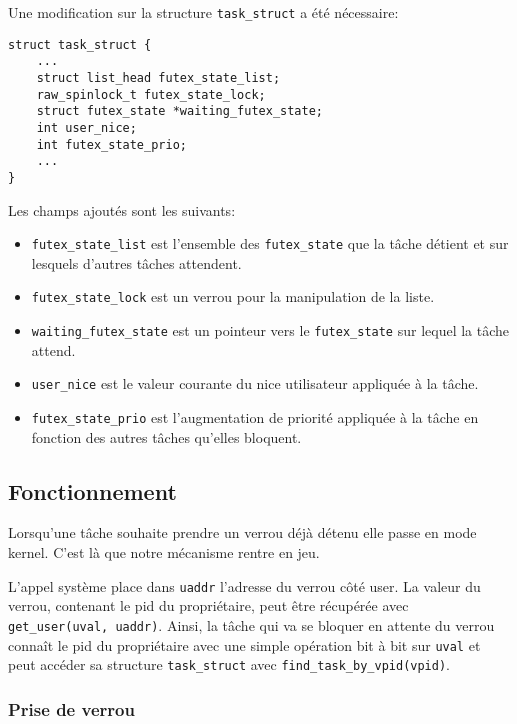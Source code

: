 Une modification sur la structure \verb|task_struct| a été nécessaire:

\begin{lstlisting}[tabsize=4]
struct task_struct {
	...
	struct list_head futex_state_list;
	raw_spinlock_t futex_state_lock;
	struct futex_state *waiting_futex_state;
	int user_nice;
	int futex_state_prio;
	...
}
\end{lstlisting}

Les champs ajoutés sont les suivants:
\begin{itemize}
	\item \verb|futex_state_list| est l'ensemble des
	\verb|futex_state| que la tâche détient et sur lesquels d'autres tâches attendent.
	
	\item \verb|futex_state_lock| est un verrou pour la manipulation de la liste.
	
	\item \verb|waiting_futex_state| est un pointeur vers le \verb|futex_state| sur lequel
	la tâche attend.
	
	\item \verb|user_nice| est le valeur courante du nice utilisateur appliquée à la tâche.
	
	\item \verb|futex_state_prio| est l'augmentation de priorité appliquée à la tâche en fonction
	des autres tâches qu'elles bloquent.
\end{itemize}

\subsection{Fonctionnement}

Lorsqu'une tâche souhaite prendre un verrou déjà détenu elle passe en mode kernel. 
C'est là que notre mécanisme rentre en jeu.

L'appel système place dans \verb|uaddr| l'adresse du verrou côté user. 
La valeur du verrou, contenant le pid du propriétaire, peut être récupérée avec \verb|get_user(uval, uaddr)|.
Ainsi, la tâche qui va se bloquer en attente du verrou connaît le pid du propriétaire avec une simple
opération bit à bit sur \verb|uval| et peut accéder sa structure \verb|task_struct| avec
\verb|find_task_by_vpid(vpid)|.

\subsubsection{Prise de verrou}

